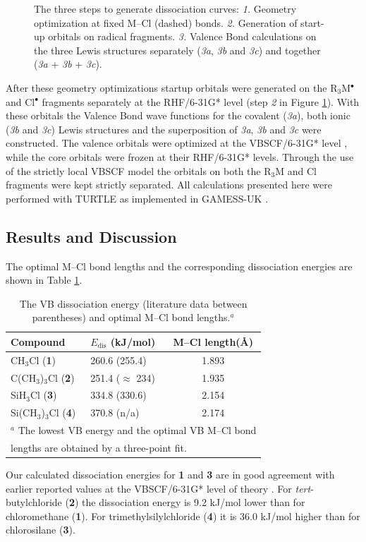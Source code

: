 \begin{figure}[ht]
\begin{center}
\end{center}
\caption{The three steps to generate dissociation curves: \textit{1.} Geometry optimization at fixed M--Cl (dashed) bonds. \textit{2.} Generation of start-up orbitals on radical fragments. \textit{3.} Valence Bond calculations on the three Lewis structures separately (\textit{3a}, \textit{3b} and \textit{3c}) and together (\textit{3a} + \textit{3b} + \textit{3c}).} 
\label{ch3.fig.scheme1}
\end{figure}
After these geometry optimizations startup orbitals were generated on the R$_3$M$^{\bullet}$ and Cl$^{\bullet}$ fragments separately at the \mbox{RHF/6-31G*} level (step \textit{2} in Figure \ref{ch3.fig.scheme1}).  With these orbitals the Valence Bond wave functions for the covalent (\textit{3a}), both ionic (\textit{3b} and \textit{3c}) Lewis structures and the superposition of \textit{3a}, \textit{3b} and \textit{3c} were constructed. The valence orbitals were optimized at the \mbox{VBSCF/6-31G*} level \cite{vbscf1,vbscf2}, while the core orbitals were frozen at their \mbox{RHF/6-31G*} levels.
Through the use of the strictly local VBSCF model the orbitals on both the R$_3$M and Cl fragments were kept strictly separated. All calculations presented here were performed with TURTLE \cite{turtle} as implemented in GAMESS-UK \cite{gamess}.

\subsection{Results and Discussion}

The optimal M--Cl bond lengths and the corresponding dissociation energies are shown in Table \ref{ch3.tab.optimal}.  
\begin{table}[htp]
\center
\caption{The VB dissociation energy (literature data \cite{lauvergnat,song} between parentheses) and optimal M--Cl bond lengths.$^a$}
\begin{tabular}{ l l c} 
\hline
Compound &$E_\mathrm{dis}$ (kJ/mol)& M--Cl length(\AA)\\
\hline
CH$_3$Cl (\textbf{1})& 260.6 (255.4) & 1.893 \\
C(CH$_3$)$_3$Cl (\textbf{2}) & 251.4 ($\approx$ 234) & 1.935 \\
SiH$_3$Cl (\textbf{3})& 334.8 (330.6)& 2.154 \\
Si(CH$_3$)$_3$Cl (\textbf{4}) & 370.8 (n/a) & 2.174 \\
\multicolumn{3}{l}{\small{$^a$ The lowest VB energy and the optimal VB M--Cl bond}}\\
\multicolumn{3}{l}{\small{lengths are obtained by a three-point fit.}}\\
\end{tabular}
\label{ch3.tab.optimal}
\end{table}
Our calculated dissociation energies for \textbf{1} and \textbf{3} are in good agreement with earlier reported values at the VBSCF/6-31G* level of theory \cite{lauvergnat}.  For \textit{tert}-butylchloride (\textbf{2}) the dissociation energy is 9.2 kJ/mol lower than for chloromethane (\textbf{1}). For trimethylsilylchloride (\textbf{4}) it is 36.0 kJ/mol higher than for chlorosilane (\textbf{3}). 
 
